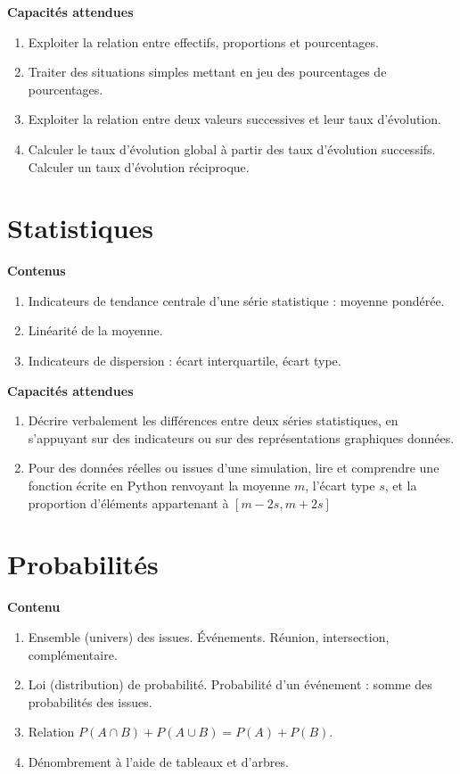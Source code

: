 \documentclass[10pt,a4paper]{article}
\begin{document}
\textbf{Capacités attendues}
 
\begin{enumerate}
\item  Exploiter la relation entre effectifs, proportions et pourcentages.
\item  Traiter des situations simples mettant en jeu des pourcentages de pourcentages.
\item  Exploiter la relation entre deux valeurs successives et leur taux d’évolution.
\item  Calculer le taux d’évolution global à partir des taux d’évolution successifs. Calculer un taux d’évolution réciproque.
\end{enumerate}

 
 
\section{Statistiques}

\textbf{Contenus}

\begin{enumerate}
\item Indicateurs de tendance centrale d’une série statistique : moyenne pondérée.
\item  Linéarité de la moyenne.
\item  Indicateurs de dispersion : écart interquartile, écart type.
\end{enumerate}

\textbf{Capacités attendues}
 
\begin{enumerate}
\item Décrire verbalement les différences entre deux séries statistiques, en s’appuyant sur 
des indicateurs ou sur des représentations graphiques données.
\item Pour des données réelles ou issues d’une simulation, lire et comprendre une fonction 
écrite en Python renvoyant la moyenne $m$, l’écart type $s$, et la proportion d’éléments 
appartenant à $[m - 2s,m + 2s]$
\end{enumerate}
 
 

\section{Probabilités}

\textbf{Contenu}

\begin{enumerate}
\item  Ensemble (univers) des issues. Événements. Réunion, intersection, complémentaire.
\item  Loi (distribution) de probabilité. Probabilité d’un événement : somme des probabilités 
des issues.
\item   Relation $P(A \cap B) + P(A \cup B) = P(A) + P(B)$.
\item  Dénombrement à l'aide de tableaux et d'arbres.
\end{enumerate}
\end{document}
